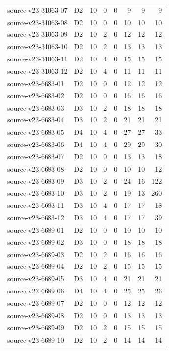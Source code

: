\begin{longtable}{p{}lrrrrrr}
source-v23-31063-07 & D2 & 10 & 0 & 0 & 9 & 9 & 9\\
source-v23-31063-08 & D2 & 10 & 0 & 0 & 10 & 10 & 10\\
source-v23-31063-09 & D2 & 10 & 2 & 0 & 12 & 12 & 12\\
source-v23-31063-10 & D2 & 10 & 2 & 0 & 13 & 13 & 13\\
source-v23-31063-11 & D2 & 10 & 4 & 0 & 15 & 15 & 15\\
source-v23-31063-12 & D2 & 10 & 4 & 0 & 11 & 11 & 11\\
source-v23-6683-01 & D2 & 10 & 0 & 0 & 12 & 12 & 12\\
source-v23-6683-02 & D2 & 10 & 0 & 0 & 16 & 16 & 16\\
source-v23-6683-03 & D3 & 10 & 2 & 0 & 18 & 18 & 18\\
source-v23-6683-04 & D3 & 10 & 2 & 0 & 21 & 21 & 21\\
source-v23-6683-05 & D4 & 10 & 4 & 0 & 27 & 27 & 33\\
source-v23-6683-06 & D4 & 10 & 4 & 0 & 29 & 29 & 30\\
source-v23-6683-07 & D2 & 10 & 0 & 0 & 13 & 13 & 18\\
source-v23-6683-08 & D2 & 10 & 0 & 0 & 10 & 10 & 12\\
source-v23-6683-09 & D3 & 10 & 2 & 0 & 24 & 16 & 122\\
source-v23-6683-10 & D3 & 10 & 2 & 0 & 19 & 13 & 260\\
source-v23-6683-11 & D3 & 10 & 4 & 0 & 17 & 17 & 18\\
source-v23-6683-12 & D3 & 10 & 4 & 0 & 17 & 17 & 39\\
source-v23-6689-01 & D2 & 10 & 0 & 0 & 10 & 10 & 10\\
source-v23-6689-02 & D3 & 10 & 0 & 0 & 18 & 18 & 18\\
source-v23-6689-03 & D2 & 10 & 2 & 0 & 16 & 16 & 16\\
source-v23-6689-04 & D2 & 10 & 2 & 0 & 15 & 15 & 15\\
source-v23-6689-05 & D3 & 10 & 4 & 0 & 21 & 21 & 21\\
source-v23-6689-06 & D4 & 10 & 4 & 0 & 25 & 25 & 26\\
source-v23-6689-07 & D2 & 10 & 0 & 0 & 12 & 12 & 12\\
source-v23-6689-08 & D2 & 10 & 0 & 0 & 13 & 13 & 13\\
source-v23-6689-09 & D2 & 10 & 2 & 0 & 15 & 15 & 15\\
source-v23-6689-10 & D2 & 10 & 2 & 0 & 14 & 14 & 14\\

\end{longtable}
